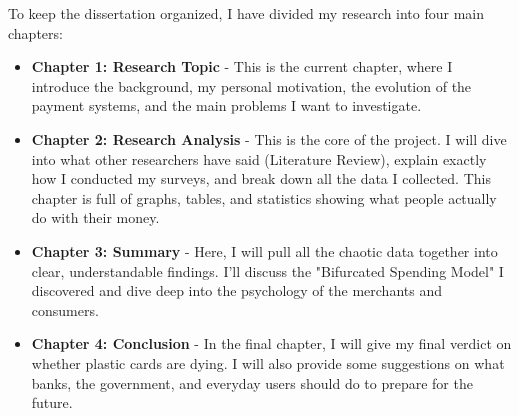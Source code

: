To keep the dissertation organized, I have divided my research into four main chapters:
\begin{itemize}
    \item \textbf{Chapter 1: Research Topic} - This is the current chapter, where I introduce the background, my personal motivation, the evolution of the payment systems, and the main problems I want to investigate.
    \item \textbf{Chapter 2: Research Analysis} - This is the core of the project. I will dive into what other researchers have said (Literature Review), explain exactly how I conducted my surveys, and break down all the data I collected. This chapter is full of graphs, tables, and statistics showing what people actually do with their money.
    \item \textbf{Chapter 3: Summary} - Here, I will pull all the chaotic data together into clear, understandable findings. I'll discuss the "Bifurcated Spending Model" I discovered and dive deep into the psychology of the merchants and consumers.
    \item \textbf{Chapter 4: Conclusion} - In the final chapter, I will give my final verdict on whether plastic cards are dying. I will also provide some suggestions on what banks, the government, and everyday users should do to prepare for the future.
\end{itemize}